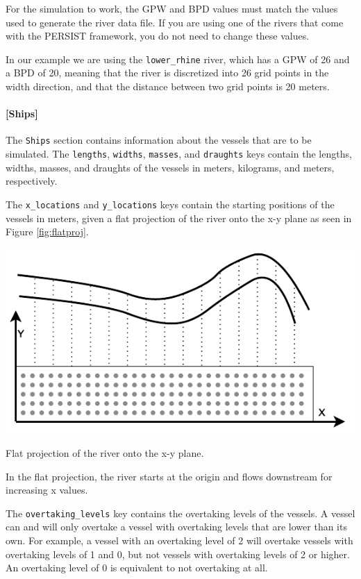 \documentclass[
	a4paper, %
	12pt, %
]{persist}
\begin{document}
\begin{note}
	For the simulation to work, the GPW and BPD values must match the values used to generate the river data file. If you are using one of the rivers that come with the PERSIST framework, you do not need to change these values.
\end{note}

In our example we are using the \verb|lower_rhine| river, which has a GPW of 26 and a BPD of 20, meaning that the river is discretized into 26 grid points in the width direction, and that the distance between two grid points is 20 meters.

\paragraph{[Ships]}

The \verb|Ships| section contains information about the vessels that are to be simulated. The \verb|lengths|, \verb|widths|, \verb|masses|, and \verb|draughts| keys contain the lengths, widths, masses, and draughts of the vessels in meters, kilograms, and meters, respectively. 


The \verb|x_locations| and \verb|y_locations| keys contain the starting positions of the vessels in meters, given a flat projection of the river onto the x-y plane as seen in Figure \ref{fig:flatproj}.
\begin{marginfigure}
	\includegraphics[width=\linewidth]{img/flatproj.pdf}
	\caption{Flat projection of the river onto the x-y plane.}
	\label{fig:flatproj}
\end{marginfigure}
In the flat projection, the river starts at the origin and flows downstream for increasing x values.


The \verb|overtaking_levels| key contains the overtaking levels of the vessels. A vessel can and will only overtake a vessel with overtaking levels that are lower than its own. For example, a vessel with an overtaking level of 2 will overtake vessels with overtaking levels of 1 and 0, but not vessels with overtaking levels of 2 or higher. An overtaking level of 0 is equivalent to not overtaking at all.
\end{document}
